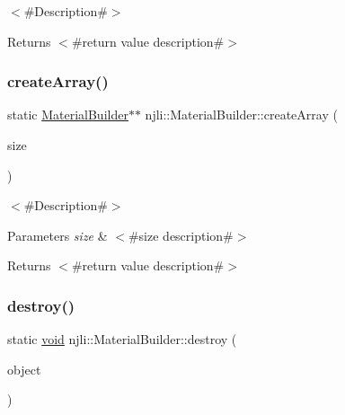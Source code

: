 $<$\#\+Description\#$>$

\begin{DoxyReturn}{Returns}
$<$\#return value description\#$>$ 
\end{DoxyReturn}
\mbox{\label{classnjli_1_1_material_builder_a7b155539c03fe505fb82942c982ccc72}} 
\subsubsection{\texorpdfstring{create\+Array()}{createArray()}}
{\footnotesize\ttfamily static \mbox{\hyperlink{classnjli_1_1_material_builder}{Material\+Builder}}$\ast$$\ast$ njli\+::\+Material\+Builder\+::create\+Array (\begin{DoxyParamCaption}\item[{const \mbox{\hyperlink{_util_8h_a10e94b422ef0c20dcdec20d31a1f5049}{u32}}}]{size }\end{DoxyParamCaption})\hspace{0.3cm}{\ttfamily [static]}}

$<$\#\+Description\#$>$


\begin{DoxyParams}{Parameters}
{\em size} & $<$\#size description\#$>$\\
\hline
\end{DoxyParams}
\begin{DoxyReturn}{Returns}
$<$\#return value description\#$>$ 
\end{DoxyReturn}
\mbox{\label{classnjli_1_1_material_builder_a2d4800c922242a8e931c98b5792b8d97}} 
\subsubsection{\texorpdfstring{destroy()}{destroy()}}
{\footnotesize\ttfamily static \mbox{\hyperlink{_thread_8h_af1e856da2e658414cb2456cb6f7ebc66}{void}} njli\+::\+Material\+Builder\+::destroy (\begin{DoxyParamCaption}\item[{\mbox{\hyperlink{classnjli_1_1_material_builder}{Material\+Builder}} $\ast$}]{object }\end{DoxyParamCaption})\hspace{0.3cm}{\ttfamily [static]}}

